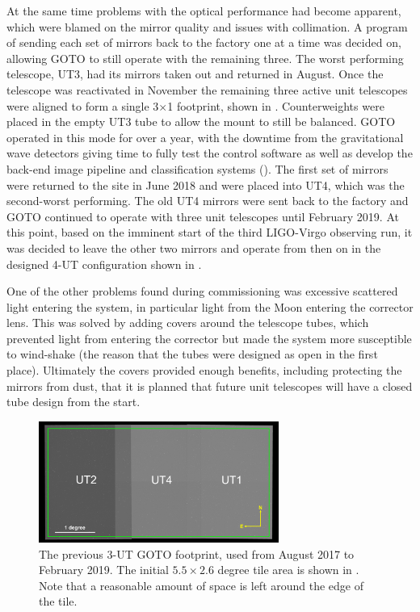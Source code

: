 \begin{colsection}
\begin{colsection}
At the same time problems with the optical performance had become apparent, which were blamed on the mirror quality and issues with collimation. A program of sending each set of mirrors back to the factory one at a time was decided on, allowing GOTO to still operate with the remaining three. The worst performing telescope, UT3, had its mirrors taken out and returned in August. Once the telescope was reactivated in November the remaining three active unit telescopes were aligned to form a single 3$\times$1 footprint, shown in . Counterweights were placed in the empty UT3 tube to allow the mount to still be balanced. GOTO operated in this mode for over a year, with the downtime from the gravitational wave detectors giving time to fully test the control software as well as develop the back-end image pipeline and classification systems (). The first set of mirrors were returned to the site in June 2018 and were placed into UT4, which was the second-worst performing. The old UT4 mirrors were sent back to the factory and GOTO continued to operate with three unit telescopes until February 2019. At this point, based on the imminent start of the third LIGO-Virgo observing run, it was decided to leave the other two mirrors and operate from then on in the designed 4-UT configuration shown in .

One of the other problems found during commissioning was excessive scattered light entering the system, in particular light from the Moon entering the corrector lens. This was solved by adding covers around the telescope tubes, which prevented light from entering the corrector but made the system more susceptible to wind-shake (the reason that the tubes were designed as open in the first place). Ultimately the covers provided enough benefits, including protecting the mirrors from dust, that it is planned that future unit telescopes will have a closed tube design from the start.

\newpage

\begin{figure}[p]
    \begin{center}
        \includegraphics[width=0.7\textwidth]{images/footprint_1_box.png}
    \end{center}
    \caption[The previous 3-UT GOTO footprint]{
        The previous 3-UT GOTO footprint, used from August 2017 to February 2019. The initial $5.5 \times 2.6$ degree tile area is shown in . Note that a reasonable amount of space is left around the edge of the tile.
    }\label{fig:3ut_footprint}
\end{figure}


\end{colsection}
\end{colsection}
